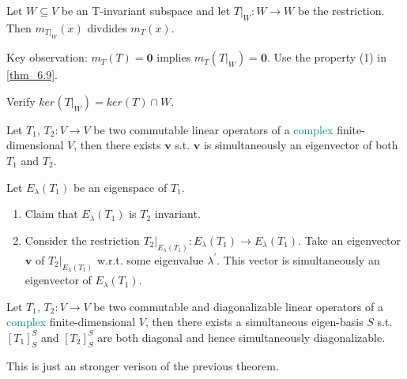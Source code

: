 \documentclass[12pt]{article}
\begin{document}
\begin{theorem}
    Let $W\subseteq V$ be an T-invariant subspace and let $T|_{W}:W\rightarrow W$ be the restriction. Then $m_{T|_{W}}(x)$ divdides $m_T(x)$.
\end{theorem}

\begin{pf}
   Key observation: $m_{T}(T)=\mathbf{0}$ implies $m_{T}(T|_{W})=\mathbf{0}$. Use the property (1) in \eqref{thm_6.9}. 
\end{pf}

\begin{exercise}
    Verify $ker(T|_{W})=ker(T)\cap W$.
\end{exercise}

\begin{theorem}
    Let $T_1,\,T_2: V\rightarrow V$ be two commutable linear operators of a \textcolor{teal}{complex} finite-dimensional $V$, then there exists $\mathbf{v}$ s.t. $\mathbf{v}$ is simultaneously an eigenvector of both $T_1$ and $T_2$.
\end{theorem}

\begin{pf}
    Let $E_\lambda(T_1)$ be an eigenspace of $T_1$.
    \begin{enumerate}
        \item Claim that $E_\lambda(T_1)$ is $T_2$ invariant.
        \item Consider the restriction $T_2|_{E_\lambda(T_1)}:E_\lambda(T_1)\rightarrow E_\lambda(T_1)$. Take an eigenvector $\mathbf{v}$ of $T_2|_{E_\lambda(T_1)}$ w.r.t. some eigenvalue $\lambda^\prime$. This vector is simultaneously an eigenvector of $E_\lambda(T_1)$.
    \end{enumerate}
\end{pf}


\begin{theorem}
    Let $T_1,\,T_2: V\rightarrow V$ be two commutable and diagonalizable linear operators of a \textcolor{teal}{complex} finite-dimensional $V$, 
    then there exists a simultaneous eigen-basis $S$ s.t. $[T_1]^{S}_{S}$ and $[T_2]^{S}_{S}$ are both diagonal and hence simultaneously diagonalizable.
\end{theorem}

\begin{pf}
    This is just an stronger verison of the previous theorem.
\end{pf}
\end{document}
